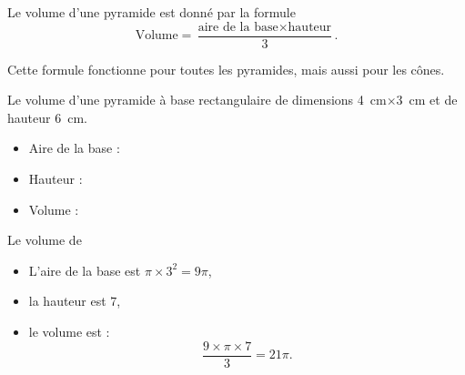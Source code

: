 \begin{propriete}
    Le volume d'une pyramide est donné par la formule
    \begin{equation}
        \text{Volume}=\frac{ \text{aire de la base}\times \text{hauteur} }{ 3 }.
    \end{equation}
\end{propriete}
Cette formule fonctionne pour toutes les pyramides, mais aussi pour les cônes.


\begin{example}
    Le volume d'une pyramide à base rectangulaire de dimensions \SI{4}{\centi\meter}\( \times\)\SI{3}{\centi\meter} et de hauteur \SI{6}{\centi\meter}.

\begin{itemize}
    \item 
        Aire de la base : 
    \item
        Hauteur : 
    \item
        Volume :
\end{itemize}

\vspace{3cm}

\begin{center}         
                                                                  
\end{center}

\end{example}

\begin{example}
    Le volume de
\begin{center}
   
\end{center}

\begin{itemize}
    \item L'aire de la base est \( \pi\times 3^2=9\pi\),
    \item la hauteur est \( 7\),
    \item le volume est :
        \begin{equation}
            \frac{ 9\times \pi\times 7 }{ 3 }=21\pi.
        \end{equation}
\end{itemize}
\end{example}




